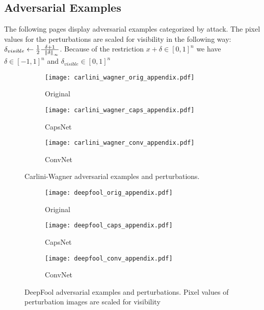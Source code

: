 \subsection{Adversarial Examples}
\label{lab:images}

The following pages display adversarial examples categorized by attack.
The pixel values for the perturbations are scaled for visibility in the following way:
$\delta_{visible} \gets \frac{1}{2}\frac{\delta + 1}{\hspace{0.5em}\norm[\infty]{\delta}}$.
Because of the restriction $x + \delta \in [0,1]^n$ we have $\delta \in [-1,1]^n$ and $\delta_{visible} \in [0,1]^n$

\begin{figure}
	\centering
	
	\begin{subfigure}{.23\textwidth}
		\centering
		\texttt{[image: carlini\_wagner\_orig\_appendix.pdf]}%
		\caption{Original}%
	\end{subfigure}%
	\begin{subfigure}{.36\textwidth}
		\centering
		\texttt{[image: carlini\_wagner\_caps\_appendix.pdf]}%
		\caption{CapsNet}
	\end{subfigure}%
	\begin{subfigure}{.36\textwidth}
		\centering
		\texttt{[image: carlini\_wagner\_conv\_appendix.pdf]}%
		\caption{ConvNet}
	\end{subfigure}
	\caption[Carlini-Wagner Adversarial Examples]{Carlini-Wagner adversarial examples and perturbations.}
	\label{fig:carlini-wagner-img}
	
\end{figure}


\begin{figure}
	\centering
	
	\begin{subfigure}{.23\textwidth}
		\centering
		\texttt{[image: deepfool\_orig\_appendix.pdf]}%
		\caption{Original}%
	\end{subfigure}%
	\begin{subfigure}{.36\textwidth}
		\centering
		\texttt{[image: deepfool\_caps\_appendix.pdf]}%
		\caption{CapsNet}
	\end{subfigure}%
	\begin{subfigure}{.36\textwidth}
		\centering
		\texttt{[image: deepfool\_conv\_appendix.pdf]}%
		\caption{ConvNet}
	\end{subfigure}
	\caption[DeepFool Adversarial Examples]{DeepFool adversarial examples and perturbations. Pixel values of perturbation images are scaled for visibility}
	\label{fig:deepfool-img}
	
\end{figure}

